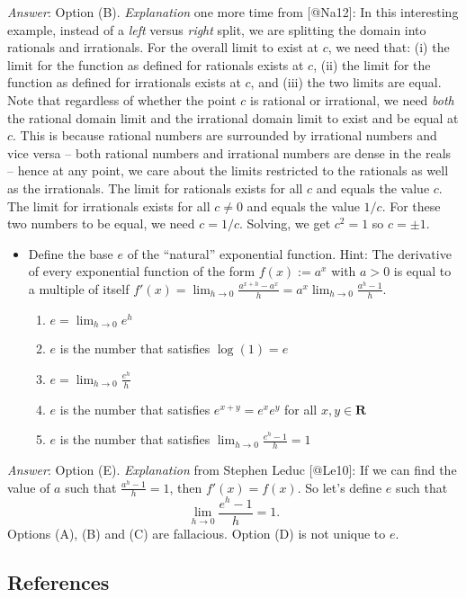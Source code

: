 \emph{Answer}: Option (B). \emph{Explanation} one more time from
{[}@Na12{]}: In this interesting example, instead of a \emph{left}
versus \emph{right} split, we are splitting the domain into rationals
and irrationals. For the overall limit to exist at \(c\), we need that:
(i) the limit for the function as defined for rationals exists at \(c\),
(ii) the limit for the function as defined for irrationals exists at
\(c\), and (iii) the two limits are equal. Note that regardless of
whether the point \(c\) is rational or irrational, we need \emph{both}
the rational domain limit and the irrational domain limit to exist and
be equal at \(c\). This is because rational numbers are surrounded by
irrational numbers and vice versa -- both rational numbers and
irrational numbers are dense in the reals -- hence at any point, we care
about the limits restricted to the rationals as well as the irrationals.
The limit for rationals exists for all \(c\) and equals the value \(c\).
The limit for irrationals exists for all \(c \ne 0\) and equals the
value \(1/c\). For these two numbers to be equal, we need \(c = 1/c\).
Solving, we get \(c^2 = 1\) so \(c = \pm 1\).

\begin{itemize}
\item
  Define the base \(e\) of the ``natural'' exponential function. Hint:
  The derivative of every exponential function of the form
  \(f(x) := a^x\) with \(a>0\) is equal to a multiple of itself
  \(f'(x) = \lim_{h\to 0}\frac{a^{x+h} -a^x}{h} = a^x \lim_{h\to 0}\frac{a^h-1}{h}\).

  \begin{enumerate}
  \def\labelenumi{(\Alph{enumi})}
  \tightlist
  \item
    \(e = \lim_{h\to 0} e^h\)
  \item
    \(e\) is the number that satisfies \(\log(1) = e\)
  \item
    \(e = \lim_{h \to 0} \frac{e^h}{h}\)
  \item
    \(e\) is the number that satisfies \(e^{x+y} = e^xe^y\) for all
    \(x,y \in \mathbf{R}\)
  \item
    \(e\) is the number that satisfies
    \(\lim_{h\to 0}\frac{e^h-1}{h} = 1\)
  \end{enumerate}
\end{itemize}

\emph{Answer}: Option (E). \emph{Explanation} from Stephen Leduc
{[}@Le10{]}: If we can find the value of \(a\) such that
\(\frac{a^h-1}{h} = 1\), then \(f'(x) = f(x)\). So let's define \(e\)
such that \[\lim_{h\to 0}\frac{e^h-1}{h} = 1.\] Options (A), (B) and (C)
are fallacious. Option (D) is not unique to \(e\).

\hypertarget{references}{%
\subsection{References}\label{references}}
